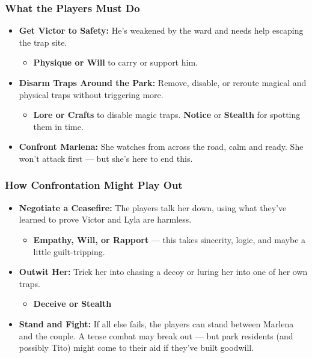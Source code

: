 \begin{multicols}{2}
\subsubsection*{What the Players Must Do}
\begin{itemize}
    \item \textbf{Get Victor to Safety:} He’s weakened by the ward and needs help escaping the trap site.
        \begin{itemize}
            \item \textbf{Physique or Will}  to carry or support him.
        \end{itemize}
    \item \textbf{Disarm Traps Around the Park:} Remove, disable, or reroute magical and physical traps without triggering more.
        \begin{itemize}
            \item \textbf{Lore or Crafts}  to disable magic traps. \textbf{Notice} or \textbf{Stealth} for spotting them in time.
        \end{itemize}
    \item \textbf{Confront Marlena:} She watches from across the road, calm and ready. She won’t attack first — but she’s here to end this.
\end{itemize}

\subsubsection*{How Confrontation Might Play Out}
\begin{itemize}
    \item \textbf{Negotiate a Ceasefire:} The players talk her down, using what they’ve learned to prove Victor and Lyla are harmless.  
        \begin{itemize}
            \item \textbf{Empathy, Will, or Rapport}  — this takes sincerity, logic, and maybe a little guilt-tripping.
        \end{itemize}
    \item \textbf{Outwit Her:} Trick her into chasing a decoy or luring her into one of her own traps.
        \begin{itemize}
            \item \textbf{Deceive or Stealth} 
        \end{itemize}
    \item \textbf{Stand and Fight:} If all else fails, the players can stand between Marlena and the couple. A tense combat may break out — but park residents (and possibly Tito) might come to their aid if they’ve built goodwill.
\end{itemize}


\end{multicols}
